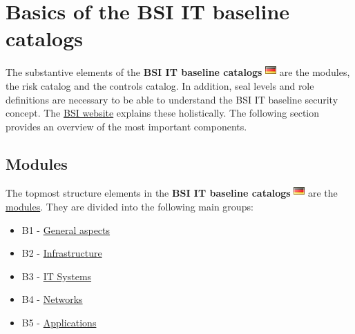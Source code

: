 \documentclass[a4paper,10pt]{book}
\begin{document}
\section{Basics of the BSI IT baseline catalogs}
The substantive elements of the \textbf{BSI IT baseline catalogs} \includegraphics[height=2ex]{Icon/GS_Kataloge.png}
are the modules, the risk catalog and the controls catalog. In addition, seal levels and role definitions are necessary
to be able to understand the BSI IT baseline security concept.
The \href{https://www.bsi.bund.de/cln_156/DE/Themen/weitereThemen/ITGrundschutzKataloge/itgrundschutzkataloge_node.html}{BSI website}
explains these holistically. The following section provides an overview of the most important components.

\subsection{Modules}
The topmost structure elements in the \textbf{BSI IT baseline catalogs} \includegraphics[height=2ex]{Icon/GS_Kataloge.png} are the
\href{https://www.bsi.bund.de/cln_156/DE/Themen/weitereThemen/ITGrundschutzKataloge/Inhalt/Bausteine/bausteine_node.html}{modules}.
They are divided into the following main groups:
\begin{itemize}
\item B1 - \href{https://www.bsi.bund.de/cln_156/DE/Themen/weitereThemen/ITGrundschutzKataloge/Inhalt/Bausteine/B1uebergeordneteAspekte/b1uebergeordneteaspekte_node.html}{General aspects}
\item B2 - \href{https://www.bsi.bund.de/cln_156/DE/Themen/weitereThemen/ITGrundschutzKataloge/Inhalt/Bausteine/B2Infrastruktur/b2infrastruktur_node.html}{Infrastructure}
\item B3 - \href{https://www.bsi.bund.de/cln_156/DE/Themen/weitereThemen/ITGrundschutzKataloge/Inhalt/Bausteine/B3ITSysteme/b3itsysteme_node.html}{IT Systems}
\item B4 - \href{https://www.bsi.bund.de/cln_156/DE/Themen/weitereThemen/ITGrundschutzKataloge/Inhalt/Bausteine/B4Netze/b4netze_node.html}{Networks}
\item B5 - \href{https://www.bsi.bund.de/cln_156/DE/Themen/weitereThemen/ITGrundschutzKataloge/Inhalt/Bausteine/B5Anwendungen/b5anwendungen_node.html}{Applications}
\end{itemize}
\end{document}

